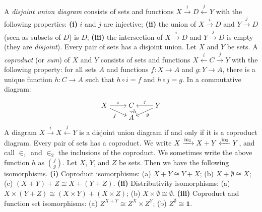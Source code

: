  A \textit{disjoint union diagram} consists of sets and functions $X \xrightarrow{i} D \xleftarrow{j} Y$ with the following properties: \textbf{(i)} $i$ and $j$ are injective; \textbf{(ii)} the union of $X \xrightarrow{i} D$ and $Y \xrightarrow{j} D$ (seen as subsets of $D$) is $D$; \textbf{(iii)} the intersection of $X \xrightarrow{i} D$ and $Y \xrightarrow{j} D$ is empty (they are \textit{disjoint}).
 Every pair of sets has a disjoint union.
 Let $X$ and $Y$ be sets. A \textit{coproduct } (or \textit{sum}) of $X$ and $Y$ consists of sets and functions $X \xleftarrow{i} C \xrightarrow{j} Y$ with the following property: for all sets $A$ and functions $f \colon X \to A$ and $g \colon Y \to A$, there is a unique function $h \colon C \to A$ such that $h \circ i = f$ and $h \circ j = g$. In a commutative diagram:
\[\begin{tikzcd}[cramped,row sep=tiny]
	X & C & Y \\
	& A
	\arrow["i", from=1-1, to=1-2]
	\arrow["f"', from=1-1, to=2-2]
	\arrow["h", dotted, from=1-2, to=2-2]
	\arrow["j"', from=1-3, to=1-2]
	\arrow["g", from=1-3, to=2-2]
\end{tikzcd}\]
 A diagram $X \xrightarrow{i} X \xleftarrow{j} Y$ is a disjoint union diagram if and only if it is a coproduct diagram.
 Every pair of sets has a coproduct.
 We write $X \xrightarrow{\operatorname{in}_1} X + Y \xleftarrow{\operatorname{in}_2} Y$, and call $\in_1$ and $\in_2$ the inclusions of the coproduct. We sometimes write the above function $h$ as $\binom{f}{g}$.
 Let $X$, $Y$, and $Z$ be sets. Then we have the following isomorphisms. \textbf{(i)} Coproduct isomorphisms: (a) $X + Y \cong Y + X$; (b) $X + \emptyset \cong X$; (c) $(X + Y) + Z \cong X + (Y + Z)$. \textbf{(ii)} Distributivity isomorphisms: (a) $X \times (Y + Z) \cong (X \times Y) + (X \times Z)$; (b) $X \times \emptyset \cong \emptyset$. \textbf{(iii)} Coproduct and function set isomorphisms: (a) $Z^{X + Y} \cong Z^X \times Z^Y$; (b) $Z^{\emptyset} \cong \mathbf{1}$.

